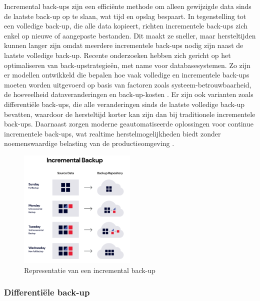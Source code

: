 Incremental back-ups zijn een efficiënte methode om alleen gewijzigde data sinds de laatste back-up op te slaan, wat tijd en opslag bespaart. In tegenstelling tot een volledige back-up, die alle data kopieert, richten incrementele back-ups zich enkel op nieuwe of aangepaste bestanden. Dit maakt ze sneller, maar hersteltijden kunnen langer zijn omdat meerdere incrementele back-ups nodig zijn naast de laatste volledige back-up. Recente onderzoeken hebben zich gericht op het optimaliseren van back-upstrategieën, met name voor databasesystemen. Zo zijn er modellen ontwikkeld die bepalen hoe vaak volledige en incrementele back-ups moeten worden uitgevoerd op basis van factoren zoals systeem-betrouwbaarheid, de hoeveelheid dataveranderingen en back-up-kosten \autocite{Zhao2024}. Er zijn ook varianten zoals differentiële back-ups, die alle veranderingen sinds de laatste volledige back-up bevatten, waardoor de hersteltijd korter kan zijn dan bij traditionele incrementele back-ups. Daarnaast zorgen moderne geautomatiseerde oplossingen voor continue incrementele back-ups, wat realtime herstelmogelijkheden biedt zonder noemenswaardige belasting van de productieomgeving \autocite{Qian2010}.
\begin{figure}[h] 
    \includegraphics[width=0.5\textwidth]{img/incrementb.png}  
    \caption{Representatie van een incremental back-up \autocite{Rivas2022}}   
    \label{fig:incrback-up}           
\end{figure}


\subsubsection{Differentiële back-up}

